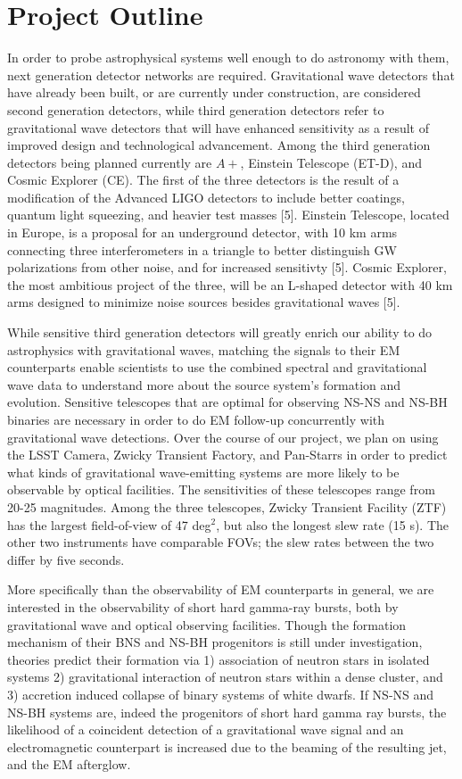 \documentclass{article}
\begin{document}
\section{Project Outline}

In order to probe astrophysical systems well enough to do astronomy with them, next generation detector networks are required.  Gravitational wave detectors that have already been built, or are currently under construction, are considered second generation detectors, while third generation detectors refer to gravitational wave detectors that will have enhanced sensitivity as a result of improved design and technological advancement.  Among the third generation detectors being planned currently are $A+$, Einstein Telescope (ET-D), and Cosmic Explorer (CE).  The first of the three detectors is the result of a modification of the Advanced LIGO detectors to include better coatings, quantum light squeezing, and heavier test masses [5].  Einstein Telescope, located in Europe, is a proposal for an underground detector, with 10 km arms connecting three interferometers in a triangle to better distinguish GW polarizations from other noise, and for increased sensitivty [5].  Cosmic Explorer, the most ambitious project of the three, will be an L-shaped detector with 40 km arms designed to minimize noise sources besides gravitational waves [5].    
 
While sensitive third generation detectors will greatly enrich our ability to do astrophysics with gravitational waves, matching the signals to their EM counterparts enable scientists to use the combined spectral and gravitational wave data to understand more about the source system's formation and evolution.  Sensitive telescopes that are optimal for observing NS-NS and NS-BH binaries are necessary in order to do EM follow-up concurrently with gravitational wave detections.  Over the course of our project, we plan on using the LSST Camera, Zwicky Transient Factory, and Pan-Starrs in order to predict what kinds of gravitational wave-emitting systems are more likely to be observable by optical facilities.  The sensitivities of these telescopes range from $~$ 20-25 magnitudes.  Among the three telescopes, Zwicky Transient Facility (ZTF) has the largest field-of-view of 47 deg$^2$, but also the longest slew rate (15 s).  The other two instruments have comparable FOVs; the slew rates between the two differ by five seconds.  

More specifically than the observability of EM counterparts in general, we are interested in the observability of short hard gamma-ray bursts, both by gravitational wave and optical observing facilities.  Though the formation mechanism of their BNS and NS-BH progenitors is still under investigation, theories predict their formation via 1) association of neutron stars in isolated systems 2) gravitational interaction of neutron stars within a dense cluster, and 3) accretion induced collapse of binary systems of white dwarfs.  If NS-NS and NS-BH systems are, indeed the progenitors of short hard gamma ray bursts, the likelihood of a coincident detection of a gravitational wave signal and an electromagnetic counterpart is increased due to the beaming of the resulting jet, and the EM afterglow.
\end{document}
